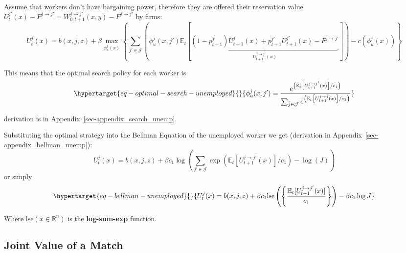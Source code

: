\documentclass[
  letterpaper,
  DIV=11,
  numbers=noendperiod]{scrreprt}
\begin{document}
Assume that workers don't have bargaining power, therefore they are
offered their reservation value
\(U^{j'}_t(x)- F^{j \to j'}=W^{j\to j'}_{0, t+1}(x,y)- F^{j \to j'}\) by
firms:
\[U^{j}_{t}(x) = b(x, j, z) + \beta \max_{\phi^j_u(x)} \left\{\sum_{j'\in \mathcal{J}} \left(\phi^j_u(x, j')\mathbb{E}_t\left[\underbrace{(1 - p_{t+1}^{j'})U^{j}_{t+1}(x) + p_{t+1}^{j'}U^{j'}_{t+1}(x) - F^{j \to j'}}_{U^{j \to j'}_{t+1}(x)}\right]\right) -c(\phi^j_u(x)) \right\} \]

This means that the optimal search policy for each worker is
\begin{equation}\protect\hypertarget{eq-optimal-search-unemployed}{}{ \phi^j_u(x,j') = \frac{e^{\left(\mathbb{E}_t\left[U^{j \to j'}_{t+1}(x)\right] /c_1\right)}}{\sum_{\tilde{j}\in \mathcal{J}}e^{\left(\mathbb{E}_t\left[U^{j \to \tilde{j}}_{t+1}(x)\right] /c_1\right)}}}\label{eq-optimal-search-unemployed}\end{equation}

derivation is in Appendix~\ref{sec-appendix_search_unemp}.

Substituting the optimal strategy into the Bellman Equation of the
unemployed worker we get (derivation in
Appendix~\ref{sec-appendix_bellman_unemp}):
\[U^{j}_{t}(x) = b(x, j, z) + \beta c_1 \log{\left( \sum_{j' \in \mathcal{J}}\exp{\left(\mathbb{E}_t[U_{t+1}^{j \to j'}(x)]/c_1\right)}-\log{(J)}\right)}\]
or simply
\begin{equation}\protect\hypertarget{eq-bellman-unemployed}{}{U^{j}_{t}(x)=b(x,j,z)+\beta c_{1}\text{lse}\left(\left\{\frac{\mathbb{E}_{t}[U^{j\to j'}_{t+1}(x)]}{c_{1}}\right\}\right) - \beta c_{1}\log{J}}\label{eq-bellman-unemployed}\end{equation}

Where \(\text{lse}(x\in \mathbb{R}^n)\) is the \textbf{log-sum-exp}
function.

\hypertarget{joint-value-of-a-match}{%
\subsection{Joint Value of a Match}\label{joint-value-of-a-match}}
\end{document}
